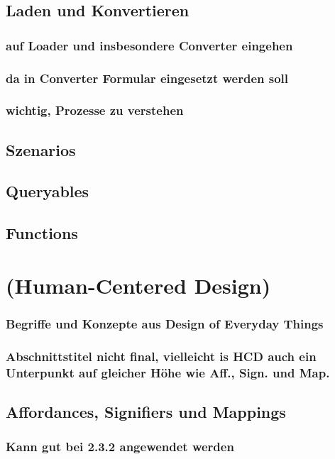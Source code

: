 \documentclass[oneside,a4paper,11pt,openright]{report}
\begin{document}
\subsection{Laden und Konvertieren}
\subsubsection{auf Loader und insbesondere Converter eingehen}
\subsubsection{da in Converter Formular eingesetzt werden soll}
\subsubsection{wichtig, Prozesse zu verstehen}
\subsection{Szenarios}



\subsection{Queryables}
\subsection{Functions}

\clearpage
\section{(Human-Centered Design)}
\subsubsection{Begriffe und Konzepte aus Design of Everyday Things}
\subsubsection{Abschnittstitel nicht final, vielleicht is HCD auch ein Unterpunkt auf gleicher Höhe wie Aff., Sign. und Map.}
\subsection{Affordances, Signifiers und Mappings}
\subsubsection{Kann gut bei 2.3.2 angewendet werden}
\end{document}
